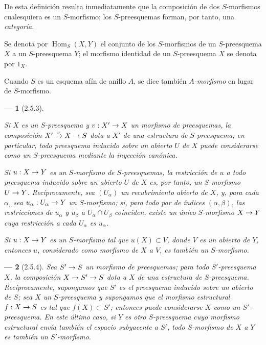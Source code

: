 \documentclass[oneside]{amsart}
\theoremstyle{ega-env-style}
\newtheorem*{env}{---}
\theoremstyle{ega-thm-env-style}
\theoremstyle{ega-defn-env-style}
\renewcommand{\to}{\mathchoice{\longrightarrow}{\rightarrow}{\rightarrow}{\rightarrow}}
\newcommand{\oldpage}[2][]{{\marginnote{\normalfont{\textbf{#1}~|~#2}}}\ignorespaces}
\let\EGAOriginalLabel\label
\renewcommand{\label}[1]{\phantomsection\EGAOriginalLabel{#1}}
\begin{document}
De esta definición resulta inmediatamente que la composición de dos $S$-morfismos cualesquiera es un $S$-morfismo;
los $S$-preesquemas forman, por tanto, una \emph{categoría}.

Se denota por $\operatorname{Hom}_S(X,Y)$ el conjunto de los $S$-morfismos de un $S$-preesquema $X$ a un $S$-preesquema $Y$;
el morfismo identidad de un $S$-preesquema $X$ se denota por $1_X$.

Cuando $S$ es un esquema afín de anillo $A$, se dice también \emph{$A$-morfismo} en lugar de $S$-morfismo.


\oldpage[I]{104}
\begin{env}[2.5.3]
\label{I.2.5.3}

Si $X$ es un $S$-preesquema y $v:X'\to X$ un morfismo de preesquemas, la composición $X'\xrightarrow{v}X\to S$ dota a $X'$ de una estructura de $S$-preesquema;
en particular, todo preesquema inducido sobre un abierto $U$ de $X$ puede considerarse como un $S$-preesquema mediante la inyección canónica.

Si $u:X\to Y$ es un $S$-morfismo de $S$-preesquemas, la restricción de $u$ a todo preesquema inducido sobre un abierto $U$ de $X$ es, por tanto, un $S$-morfismo $U\to Y$.
Recíprocamente, sea $(U_\alpha)$ un recubrimiento abierto de $X$, y, para cada $\alpha$, sea $u_\alpha:U_\alpha\to Y$ un $S$-morfismo;
si, para todo par de índices $(\alpha,\beta)$, las restricciones de $u_\alpha$ y $u_\beta$ a $U_\alpha\cap U_\beta$ coinciden, existe un único $S$-morfismo $X\to Y$ cuya restricción a cada $U_\alpha$ es $u_\alpha$.

Si $u:X\to Y$ es un $S$-morfismo tal que $u(X)\subset V$, donde $V$ es un abierto de $Y$, entonces $u$, considerado como morfismo de $X$ a $V$, es también un $S$-morfismo.
\end{env}

\begin{env}[2.5.4]
\label{I.2.5.4}
Sea $S'\to S$ un morfismo de preesquemas;
para todo $S'$-preesquema $X$, la composición $X\to S'\to S$ dota a $X$ de una estructura de $S$-preesquema.
Recíprocamente, supongamos que $S'$ es el preesquema inducido sobre un abierto de $S$;
sea $X$ un $S$-preesquema y supongamos que el morfismo estructural $f:X\to S$ es tal que $f(X)\subset S'$;
entonces puede considerarse $X$ como un $S'$-preesquema.
En este último caso, si $Y$ es otro $S$-preesquema cuyo morfismo estructural envía también el espacio subyacente a $S'$, todo $S$-morfismo de $X$ a $Y$ es también un $S'$-morfismo.
\end{env}
\end{document}
